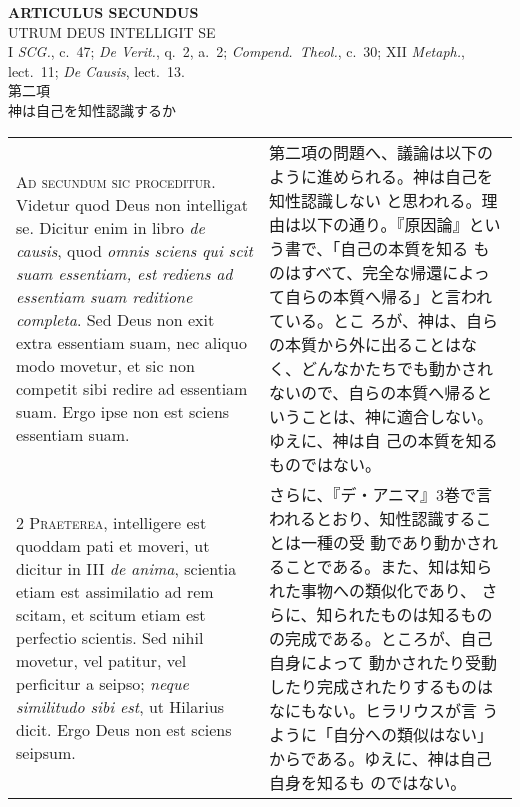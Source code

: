 \documentclass[10pt]{jsarticle} %
\begin{document}
\newpage

\begin{center}
 {\Large {\bf ARTICULUS SECUNDUS}}\\
 {\large UTRUM DEUS INTELLIGIT SE}\\
 {\footnotesize I {\itshape SCG.}, c.~47; {\itshape De Verit.}, q.~2,
 a.~2; {\itshape Compend.~Theol.}, c.~30; XII {\itshape Metaph.},
 lect.~11; {\itshape De Causis}, lect.~13.}\\
 {\Large 第二項\\神は自己を知性認識するか}
\end{center}

\begin{longtable}{p{21em}p{21em}}

{\huge A}{\scshape d secundum sic proceditur}. Videtur quod Deus non
intelligat se. Dicitur enim in libro {\itshape de causis}, quod
{\itshape omnis sciens qui scit suam essentiam, est rediens ad essentiam
suam reditione completa}. Sed Deus non exit extra essentiam suam, nec
aliquo modo movetur, et sic non competit sibi redire ad essentiam
suam. Ergo ipse non est sciens essentiam suam.


&

第二項の問題へ、議論は以下のように進められる。神は自己を知性認識しない
と思われる。理由は以下の通り。『原因論』という書で、「自己の本質を知る
ものはすべて、完全な帰還によって自らの本質へ帰る」と言われている。とこ
ろが、神は、自らの本質から外に出ることはなく、どんなかたちでも動かされ
ないので、自らの本質へ帰るということは、神に適合しない。ゆえに、神は自
己の本質を知るものではない。

\\


{\scshape 2 Praeterea}, intelligere est quoddam pati et moveri, ut
dicitur in III {\itshape de anima}, scientia etiam est assimilatio ad
rem scitam, et scitum etiam est perfectio scientis. Sed nihil movetur,
vel patitur, vel perficitur a seipso; {\itshape neque similitudo sibi
est}, ut Hilarius dicit. Ergo Deus non est sciens seipsum.


&

さらに、『デ・アニマ』3巻で言われるとおり、知性認識することは一種の受
動であり動かされることである。また、知は知られた事物への類似化であり、
さらに、知られたものは知るものの完成である。ところが、自己自身によって
動かされたり受動したり完成されたりするものはなにもない。ヒラリウスが言
うように「自分への類似はない」からである。ゆえに、神は自己自身を知るも
のではない。


\end{longtable}
\end{document}
